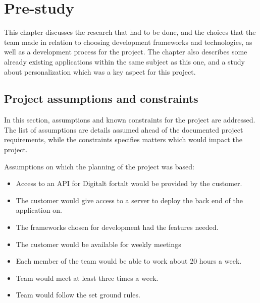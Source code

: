 
\chapter{Pre-study}

This chapter discusses the research that had to be done, and the choices that the team made in relation to choosing development frameworks and technologies, as well as a development process for the project. The chapter also describes some already existing applications within the same subject as this one, and a study about personalization which was a key aspect for this project.

\section{Project assumptions and constraints}

In this section, assumptions and known constraints for the project are addressed. The list of assumptions are details assumed ahead of the documented project requirements, while the constraints specifies matters which would impact the project.

Assumptions on which the planning of the project was based:
\begin{itemize}
	\item Access to an  API for Digitalt fortalt would be provided by the customer.
	\item The customer would give access to a server to deploy the back end of the application on.
	\item The frameworks chosen for development had the features needed.
	\item The customer would be available for weekly meetings
	\item Each member of the team would be able to work about 20 hours a week.
	\item Team would meet at least three times a week.
	\item Team would follow the set ground rules.
\end{itemize}

